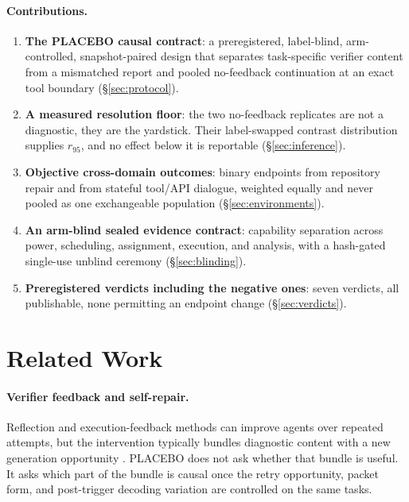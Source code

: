 \documentclass{article}
\begin{document}
\paragraph{Contributions.}
\begin{enumerate}
    \item \textbf{The PLACEBO causal contract}: a preregistered, label-blind,
    arm-controlled, snapshot-paired design that separates task-specific
    verifier content from a mismatched report and pooled no-feedback
    continuation at an exact tool boundary (\S\ref{sec:protocol}).
    \item \textbf{A measured resolution floor}: the two no-feedback replicates
    are not a diagnostic, they are the yardstick. Their label-swapped contrast
    distribution supplies $r_{95}$, and no effect below it is reportable
    (\S\ref{sec:inference}).
    \item \textbf{Objective cross-domain outcomes}: binary endpoints from
    repository repair and from stateful tool/API dialogue, weighted equally and
    never pooled as one exchangeable population (\S\ref{sec:environments}).
    \item \textbf{An arm-blind sealed evidence contract}: capability separation
    across power, scheduling, assignment, execution, and analysis, with a
    hash-gated single-use unblind ceremony (\S\ref{sec:blinding}).
    \item \textbf{Preregistered verdicts including the negative ones}: seven
    verdicts, all publishable, none permitting an endpoint change
    (\S\ref{sec:verdicts}).
\end{enumerate}

\section{Related Work}
\label{sec:related}

\paragraph{Verifier feedback and self-repair.}
Reflection and execution-feedback methods can improve agents over repeated
attempts, but the intervention typically bundles diagnostic content with a new
generation opportunity \cite{shinn_reflexion_2023,gehring_rlef_2024}. PLACEBO
does not ask whether that bundle is useful. It asks which part of the bundle is
causal once the retry opportunity, packet form, and post-trigger decoding
variation are controlled on the same tasks.
\end{document}

